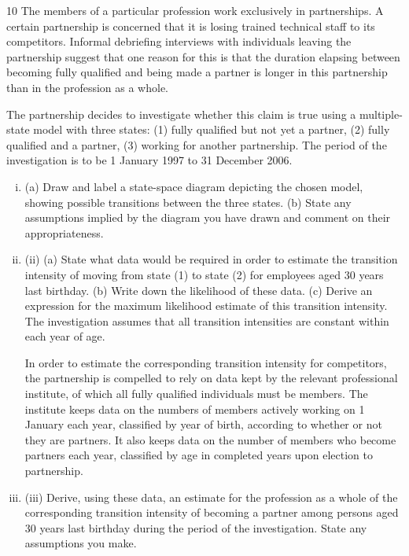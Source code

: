 \documentclass[a4paper,12pt]{article}
\begin{document}
\begin{enumerate}
10
The members of a particular profession work exclusively in partnerships. A certain partnership is concerned that it is losing trained technical staff to its competitors. Informal debriefing interviews with individuals leaving the partnership
suggest that one reason for this is that the duration elapsing between becoming fully qualified and being made a partner is longer in this partnership than in the profession as a whole.

The partnership decides to investigate whether this claim is true using a multiple-state model with three states: (1) fully qualified but not yet a partner, (2) fully qualified and a partner, (3) working for another partnership. The period of the investigation is to
be 1 January 1997 to 31 December 2006.
\begin{enumerate}[(i)]
\item (a) Draw and label a state-space diagram depicting the chosen model,
showing possible transitions between the three states.
(b) State any assumptions implied by the diagram you have drawn and
comment on their appropriateness.

\item (ii)
(a) State what data would be required in order to estimate the transition
intensity of moving from state (1) to state (2) for employees aged 30
years last birthday.
(b) Write down the likelihood of these data.
(c) Derive an expression for the maximum likelihood estimate of this
transition intensity.
The investigation assumes that all transition intensities are constant within
each year of age.
\medskip

In order to estimate the corresponding transition intensity for competitors, the
partnership is compelled to rely on data kept by the relevant professional institute, of
which all fully qualified individuals must be members. The institute keeps data on the
numbers of members actively working on 1 January each year, classified by year of
birth, according to whether or not they are partners. It also keeps data on the number
of members who become partners each year, classified by age in completed years
upon election to partnership.
\item (iii)
Derive, using these data, an estimate for the profession as a whole of the
corresponding transition intensity of becoming a partner among persons aged
30 years last birthday during the period of the investigation. State any
assumptions you make.
\end{enumerate}


\end{enumerate}
\end{document}
